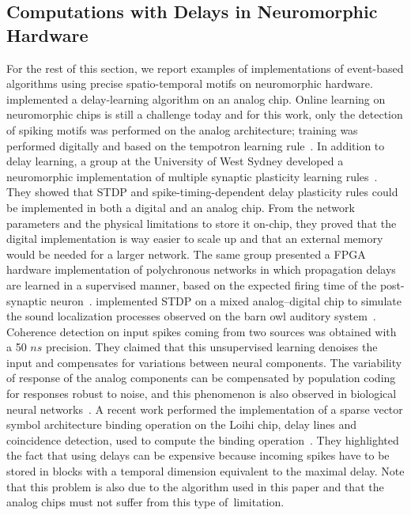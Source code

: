 \documentclass[brainsci, %
               review,accept,pdftex,moreauthors
               ]{Definitions/mdpi}
\begin{document}
\subsection{Computations with Delays in Neuromorphic Hardware}
%
For the rest of this section, we report examples of implementations of event-based algorithms using precise spatio-temporal motifs on neuromorphic hardware. 
\citep{hussain_deltron_2012} implemented a delay-learning algorithm on an analog chip. Online learning on neuromorphic chips is still a challenge today and for this work, only the detection of spiking motifs was performed on the analog architecture; training was performed digitally and based on the tempotron learning rule~\citep{gutig_tempotron_2006}. In addition to delay learning, a group at the University of West Sydney developed a neuromorphic implementation of multiple synaptic plasticity learning rules~\citep{wang_neuromorphic_2015}. They showed that STDP and spike-timing-dependent delay plasticity rules could be implemented in both a digital and an analog chip. From the network parameters and the physical limitations to store it on-chip, they proved that the digital implementation is way easier to scale up and that an external memory would be needed for a larger network. The same group presented a FPGA hardware implementation of polychronous networks in which propagation delays are learned in a supervised manner, based on the expected firing time of the post-synaptic neuron~\citep{wang_fpga_2014}. %
\citet{pfeil_neuromorphic_2013} implemented STDP on a mixed analog--digital chip to simulate the sound localization processes observed on the barn owl auditory system~\citep{gerstner_neuronal_1996}. Coherence detection on input spikes coming from two sources was obtained with a 50 $ns$ precision. They claimed that this unsupervised learning denoises the input and compensates for variations between neural components. The variability of response of the analog components can be compensated by population coding for responses robust to noise, and this phenomenon is also observed in biological neural networks~\citep{boerlin_spike-based_2011}. 
A recent work performed the implementation of a sparse vector symbol architecture binding operation on the Loihi chip, delay lines and coincidence detection, used to compute the binding operation~\citep{renner_sparse_2022}. They highlighted the fact that using delays can be expensive  because incoming spikes have to be stored in blocks with a temporal dimension equivalent to the maximal delay. Note that this problem is also due to the algorithm used in this paper and that the analog chips must not suffer from this type of~limitation. 
\end{document}
